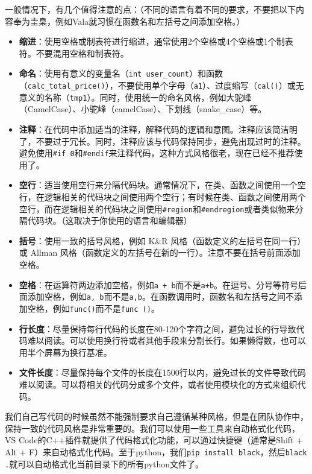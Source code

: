 \documentclass[../main.tex]{subfiles}
\begin{document}
一般情况下，有几个值得注意的点：（不同的语言有着不同的要求，不要把以下内容奉为圭臬，例如Vala就习惯在函数名和左括号之间添加空格。）
\begin{itemize}
  \item \textbf{缩进}：使用空格或制表符进行缩进，通常使用2个空格或4个空格或1个制表符。不要混用空格和制表符。
  \item \textbf{命名}：使用有意义的变量名（\texttt{int user\_count}）和函数（\texttt{calc\_total\_price()}），不要使用单个字母（\texttt{a1}）、过度缩写（\texttt{cal()}）或无意义的名称（\texttt{tmp1}）。同时，使用统一的命名风格，例如大驼峰（CamelCase）、小驼峰（camelCase）、下划线（snake\_case）等。
  \item \textbf{注释}：在代码中添加适当的注释，解释代码的逻辑和意图。注释应该简洁明了，不要过于冗长。同时，注释应该与代码保持同步，避免出现过时的注释。避免使用\texttt{\#if 0}和\texttt{\#endif}来注释代码，这种方式风格很老，现在已经不推荐使用了。
  \item \textbf{空行}：适当使用空行来分隔代码块。通常情况下，在类、函数之间使用一个空行，在逻辑相关的代码块之间使用两个空行；有时候在类、函数之间使用两个空行，而在逻辑相关的代码块之间使用\texttt{\#region}和\texttt{\#endregion}或者类似物来分隔代码块。（这取决于你使用的语言和编辑器）
  \item \textbf{括号}：使用一致的括号风格，例如 K\&R 风格（函数定义的左括号在同一行）或 Allman 风格（函数定义的左括号在新的一行）。注意不要在括号前面添加空格。
  \item \textbf{空格}：在运算符两边添加空格，例如\texttt{a + b}而不是\texttt{a+b}。在逗号、分号等符号后面添加空格，例如\texttt{a, b}而不是\texttt{a,b}。在函数调用时，函数名和左括号之间不添加空格，例如\texttt{func()}而不是\texttt{func ()}。
  \item \textbf{行长度}：尽量保持每行代码的长度在80-120个字符之间，避免过长的行导致代码难以阅读。可以使用换行符或者其他手段来分割长行。如果懒得数，也可以用半个屏幕为换行基准。
  \item \textbf{文件长度}：尽量保持每个文件的长度在1500行以内，避免过长的文件导致代码难以阅读。可以将相关的代码分成多个文件，或者使用模块化的方式来组织代码。
\end{itemize}

我们自己写代码的时候虽然不能强制要求自己遵循某种风格，但是在团队协作中，保持一致的代码风格是非常重要的。我们可以使用一些工具来自动格式化代码，VS Code的C++插件就提供了代码格式化功能，可以通过快捷键（通常是Shift + Alt + F）来自动格式化代码。至于python，我们\texttt{pip install black}，然后\texttt{black .}就可以自动格式化当前目录下的所有python文件了。
\end{document}
